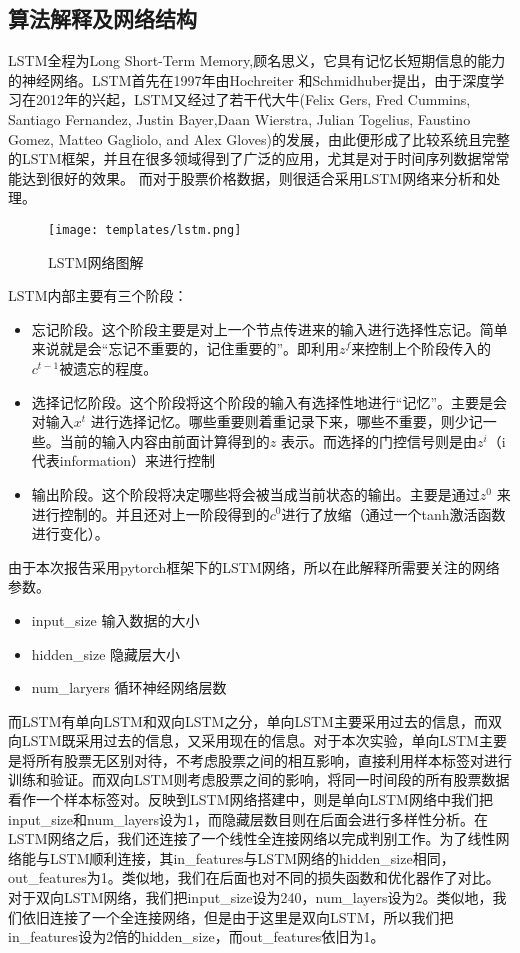 \documentclass[addpoints,answers]{exam}
\begin{document}
\subsection{算法解释及网络结构}
LSTM全程为Long Short-Term Memory,顾名思义，它具有记忆长短期信息的能力的神经网络。LSTM首先在1997年由Hochreiter 和Schmidhuber提出，由于深度学习在2012年的兴起，LSTM又经过了若干代大牛(Felix Gers, Fred Cummins, Santiago Fernandez, Justin Bayer,Daan Wierstra, Julian Togelius, Faustino Gomez, Matteo Gagliolo, and Alex Gloves)的发展，由此便形成了比较系统且完整的LSTM框架，并且在很多领域得到了广泛的应用，尤其是对于时间序列数据常常能达到很好的效果。
而对于股票价格数据，则很适合采用LSTM网络来分析和处理。
\begin{figure}[H] %
\centering %
\texttt{[image: templates/lstm.png]} %
\caption{LSTM网络图解} %
\label{Fig.main2} %
\end{figure}

LSTM内部主要有三个阶段：
\begin{itemize}
    \item 忘记阶段。这个阶段主要是对上一个节点传进来的输入进行选择性忘记。简单来说就是会“忘记不重要的，记住重要的”。即利用$z^f$来控制上个阶段传入的$c^{t-1}$被遗忘的程度。
    \item 选择记忆阶段。这个阶段将这个阶段的输入有选择性地进行“记忆”。主要是会对输入$x^t$ 进行选择记忆。哪些重要则着重记录下来，哪些不重要，则少记一些。当前的输入内容由前面计算得到的$z$ 表示。而选择的门控信号则是由$z^i$（i代表information）来进行控制
    \item 输出阶段。这个阶段将决定哪些将会被当成当前状态的输出。主要是通过$z^0$ 来进行控制的。并且还对上一阶段得到的$c^0$进行了放缩（通过一个tanh激活函数进行变化）。
\end{itemize}
    
由于本次报告采用pytorch框架下的LSTM网络，所以在此解释所需要关注的网络参数。
\begin{itemize}
    \item input\_size 输入数据的大小
    \item hidden\_size 隐藏层大小
    \item num\_laryers 循环神经网络层数
\end{itemize}

而LSTM有单向LSTM和双向LSTM之分，单向LSTM主要采用过去的信息，而双向LSTM既采用过去的信息，又采用现在的信息。对于本次实验，单向LSTM主要是将所有股票无区别对待，不考虑股票之间的相互影响，直接利用样本标签对进行训练和验证。而双向LSTM则考虑股票之间的影响，将同一时间段的所有股票数据看作一个样本标签对。反映到LSTM网络搭建中，则是单向LSTM网络中我们把input\_size和num\_layers设为1，而隐藏层数目则在后面会进行多样性分析。在LSTM网络之后，我们还连接了一个线性全连接网络以完成判别工作。为了线性网络能与LSTM顺利连接，其in\_features与LSTM网络的hidden\_size相同，out\_features为1。类似地，我们在后面也对不同的损失函数和优化器作了对比。对于双向LSTM网络，我们把input\_size设为240，num\_layers设为2。类似地，我们依旧连接了一个全连接网络，但是由于这里是双向LSTM，所以我们把in\_features设为2倍的hidden\_size，而out\_features依旧为1。
\end{document}
